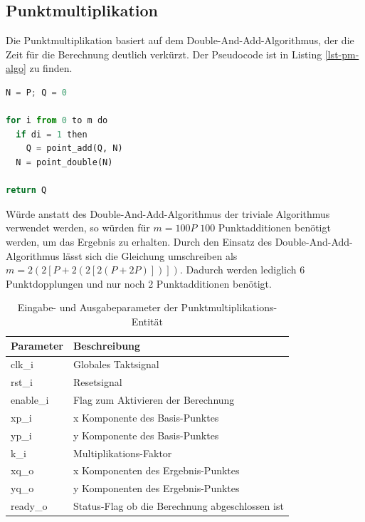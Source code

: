 \subsection{Punktmultiplikation}
Die Punktmultiplikation basiert auf dem Double-And-Add-Algorithmus, der die Zeit für die Berechnung deutlich verkürzt. Der Pseudocode ist in Listing \ref{lst-pm-algo} zu finden.  \\

\begin{lstlisting}[language=Python,frame=single,label=lst-pm-algo,caption=Pseudocode des Double-And-Add Algorithmus]
N = P; Q = 0

for i from 0 to m do
  if di = 1 then
    Q = point_add(Q, N)
  N = point_double(N)

return Q
\end{lstlisting}

Würde anstatt des Double-And-Add-Algorithmus der triviale Algorithmus verwendet werden, so würden für $m = 100 P$ $100$ Punktadditionen benötigt werden, um das Ergebnis zu erhalten. Durch den Einsatz des Double-And-Add-Algorithmus lässt sich die Gleichung umschreiben als $m = 2(2[P + 2(2[2(P + 2P)])])$. Dadurch werden lediglich 6 Punktdopplungen und nur noch 2 Punktadditionen benötigt. \\

\begin{table} [h]
	\centering 
	\begin{tabular}{ | p{3cm} | p{12cm} | }
		\hline
		\textbf{Parameter} & \textbf{Beschreibung}\\
		\hline
		clk\_i & Globales Taktsignal \\
		\hline
		rst\_i & Resetsignal \\
		\hline
		enable\_i & Flag zum Aktivieren der Berechnung \\
		\hline
		xp\_i & x Komponente des Basis-Punktes \\
		\hline
		yp\_i & y Komponente des Basis-Punktes \\
		\hline
		k\_i & Multiplikations-Faktor \\
		\hline
		xq\_o & x Komponenten des Ergebnis-Punktes \\
		\hline
		yq\_o & y Komponenten des Ergebnis-Punktes \\
		\hline
		ready\_o & Status-Flag ob die Berechnung abgeschlossen ist  \\
		\hline
		\hline
	\end{tabular}
	\caption{Eingabe- und Ausgabeparameter der Punktmultiplikations-Entität}
	\label{tab:vhdl-impl-eccmul-param}
\end{table}

